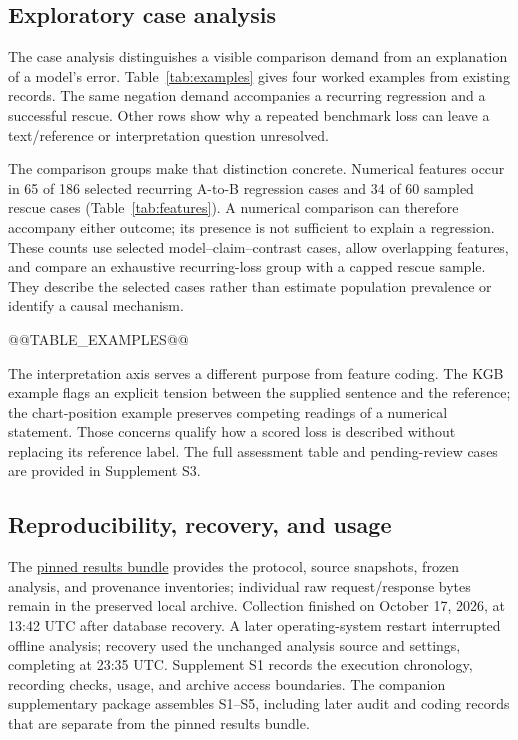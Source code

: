 \documentclass[11pt,letterpaper]{article}
\begin{document}
\subsection{Exploratory case analysis}\label{sec:cases}
The case analysis distinguishes a visible comparison demand from an explanation of a model's error. Table~\ref{tab:examples} gives four worked examples from existing records. The same negation demand accompanies a recurring regression and a successful rescue. Other rows show why a repeated benchmark loss can leave a text/reference or interpretation question unresolved.

The comparison groups make that distinction concrete. Numerical features occur in 65 of 186 selected recurring A-to-B regression cases and 34 of 60 sampled rescue cases (Table~\ref{tab:features}). A numerical comparison can therefore accompany either outcome; its presence is not sufficient to explain a regression. These counts use selected model--claim--contrast cases, allow overlapping features, and compare an exhaustive recurring-loss group with a capped rescue sample. They describe the selected cases rather than estimate population prevalence or identify a causal mechanism.

@@TABLE_EXAMPLES@@

The interpretation axis serves a different purpose from feature coding. The KGB example flags an explicit tension between the supplied sentence and the reference; the chart-position example preserves competing readings of a numerical statement. Those concerns qualify how a scored loss is described without replacing its reference label. The full assessment table and pending-review cases are provided in Supplement S3.

\subsection{Reproducibility, recovery, and usage}\label{sec:repro}
The \href{https://github.com/ChimdumebiNebolisa/Evidex/tree/3893a57e6f9addadf2b2fcd2d5a4e7251abcb677/replacement_predictor_v1/published/full3-2026-10-17}{pinned results bundle} provides the protocol, source snapshots, frozen analysis, and provenance inventories; individual raw request/response bytes remain in the preserved local archive. Collection finished on October 17, 2026, at 13:42 UTC after database recovery. A later operating-system restart interrupted offline analysis; recovery used the unchanged analysis source and settings, completing at 23:35 UTC. Supplement S1 records the execution chronology, recording checks, usage, and archive access boundaries. The companion supplementary package assembles S1--S5, including later audit and coding records that are separate from the pinned results bundle.
\end{document}
